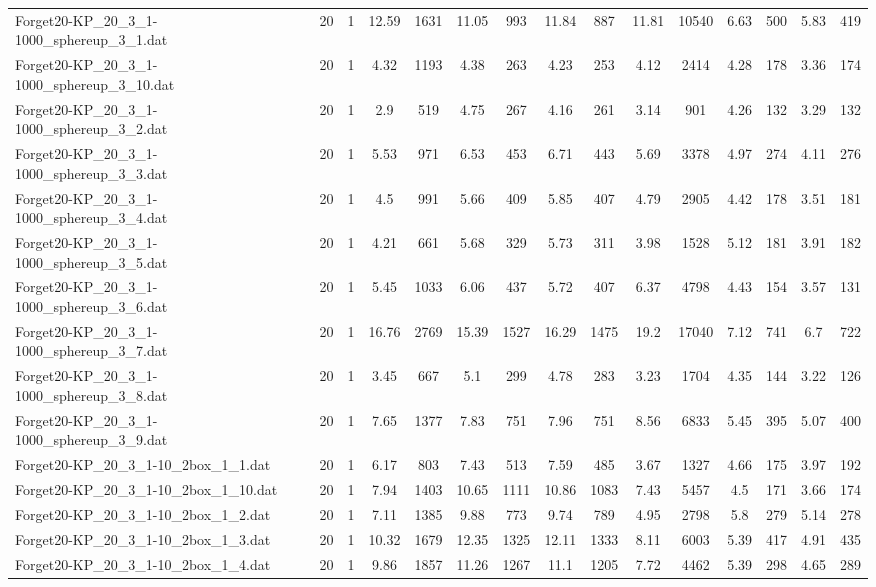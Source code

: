\begin{table}[!ht]
{\begin{tabular}{lcccccccccccccc}
Forget20-KP\_20\_3\_1-1000\_sphereup\_3\_1.dat & 20 & 1 & 12.59 & 1631 & 11.05 & 993 & 11.84 & 887 & 11.81 & 10540 & 6.63 & 500 & 5.83 & 419 \\
Forget20-KP\_20\_3\_1-1000\_sphereup\_3\_10.dat & 20 & 1 & 4.32 & 1193 & 4.38 & 263 & 4.23 & 253 & 4.12 & 2414 & 4.28 & 178 & 3.36 & 174 \\
Forget20-KP\_20\_3\_1-1000\_sphereup\_3\_2.dat & 20 & 1 & 2.9 & 519 & 4.75 & 267 & 4.16 & 261 & 3.14 & 901 & 4.26 & 132 & 3.29 & 132 \\
Forget20-KP\_20\_3\_1-1000\_sphereup\_3\_3.dat & 20 & 1 & 5.53 & 971 & 6.53 & 453 & 6.71 & 443 & 5.69 & 3378 & 4.97 & 274 & 4.11 & 276 \\
Forget20-KP\_20\_3\_1-1000\_sphereup\_3\_4.dat & 20 & 1 & 4.5 & 991 & 5.66 & 409 & 5.85 & 407 & 4.79 & 2905 & 4.42 & 178 & 3.51 & 181 \\
Forget20-KP\_20\_3\_1-1000\_sphereup\_3\_5.dat & 20 & 1 & 4.21 & 661 & 5.68 & 329 & 5.73 & 311 & 3.98 & 1528 & 5.12 & 181 & 3.91 & 182 \\
Forget20-KP\_20\_3\_1-1000\_sphereup\_3\_6.dat & 20 & 1 & 5.45 & 1033 & 6.06 & 437 & 5.72 & 407 & 6.37 & 4798 & 4.43 & 154 & 3.57 & 131 \\
Forget20-KP\_20\_3\_1-1000\_sphereup\_3\_7.dat & 20 & 1 & 16.76 & 2769 & 15.39 & 1527 & 16.29 & 1475 & 19.2 & 17040 & 7.12 & 741 & 6.7 & 722 \\
Forget20-KP\_20\_3\_1-1000\_sphereup\_3\_8.dat & 20 & 1 & 3.45 & 667 & 5.1 & 299 & 4.78 & 283 & 3.23 & 1704 & 4.35 & 144 & 3.22 & 126 \\
Forget20-KP\_20\_3\_1-1000\_sphereup\_3\_9.dat & 20 & 1 & 7.65 & 1377 & 7.83 & 751 & 7.96 & 751 & 8.56 & 6833 & 5.45 & 395 & 5.07 & 400 \\
Forget20-KP\_20\_3\_1-10\_2box\_1\_1.dat & 20 & 1 & 6.17 & 803 & 7.43 & 513 & 7.59 & 485 & 3.67 & 1327 & 4.66 & 175 & 3.97 & 192 \\
Forget20-KP\_20\_3\_1-10\_2box\_1\_10.dat & 20 & 1 & 7.94 & 1403 & 10.65 & 1111 & 10.86 & 1083 & 7.43 & 5457 & 4.5 & 171 & 3.66 & 174 \\
Forget20-KP\_20\_3\_1-10\_2box\_1\_2.dat & 20 & 1 & 7.11 & 1385 & 9.88 & 773 & 9.74 & 789 & 4.95 & 2798 & 5.8 & 279 & 5.14 & 278 \\
Forget20-KP\_20\_3\_1-10\_2box\_1\_3.dat & 20 & 1 & 10.32 & 1679 & 12.35 & 1325 & 12.11 & 1333 & 8.11 & 6003 & 5.39 & 417 & 4.91 & 435 \\
Forget20-KP\_20\_3\_1-10\_2box\_1\_4.dat & 20 & 1 & 9.86 & 1857 & 11.26 & 1267 & 11.1 & 1205 & 7.72 & 4462 & 5.39 & 298 & 4.65 & 289 \\

\end{tabular}}
\end{table}

